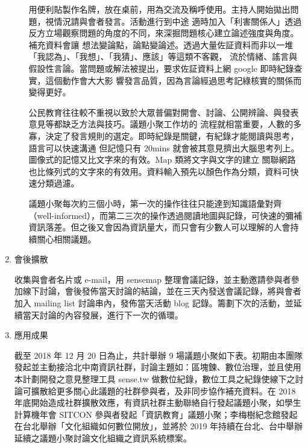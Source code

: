 \documentclass[12pt,a4paper]{article}
\begin{document}
\begin{enumerate}
\begin{enumerate}
用便利貼製作名牌，放在桌前，用為交流及稱呼使用。主持人開始拋出問題，視情況請與會者發言。活動進行到中途
適時加入「利害關係人」透過反方立場觀察問題的角度的不同，來深掘問題核心建立論述強度與角度。補充資料會讓
想法變論點，論點變論述。透過大量佐証資料而非以一堆「我認為」、「我想」、「我猜」、應該」等這類不客觀，
流於情緒、謠言與假設性言論。當問題或解法被提出，要求佐証資料上網 google 即時紀錄查實，這個動作會大大影
響發言品質，因為言論經過思考記綠核實的關係而變得更好。

公民教育往往較不重視以致於大眾普偏對開會、討論、公開辨論、與發表意見等都缺乏方法與技巧。議題小聚工作坊的
流程就相當重要，人數的多寡，決定了發言規則的選定。即時紀錄是關鍵，有紀錄才能閱讀與思考，語言可以快速溝通
但記憶只有 20mins 就會被其意見擠出大腦思考列上。圖像式的記憶又比文字來的有效。Map 類將文字與文字的建立
關聯網路也比條列式的文字來的有效用。資料輸入預先以顏色作為分類，資料可快速分類過濾。

議題小聚每次約三個小時，第一次的操作往往只能達到知識語彙對齊（well-informed），而第二三次的操作透過閱讀地圖與記錄，可快速的彌補資訊落差。但之後又會因為資訊量大，而只會有少數人可以理解的人會持續關心相關議題。
\end{enumerate}
\item 會後擴散
\label{sec:orgb343b39}

收集與會者名片或 e-mail，用 sensemap 整理會議記錄，並主動邀請參與者參加線下討論，會後發佈當天討論的結論，並在三天內發送會議記錄，將與會者加入 mailing list 討論串內，發佈當天活動 blog 記錄。籌劃下次的活動，並延續當天討論的內容發展，進行下一次的循環。

\item 應用成果
\label{sec:org72f8f8e}

截至 2018 年 12 月 20 日為止，共計舉辦 9 場議題小聚如下表。初期由本團隊發起並主動接洽北中南資訊社群，討論主題如：區塊鍊、數位治理，並且使用本計劃開發之意見整理工具 sense.tw 做數位紀錄，數位工具之紀錄使線下之討論可擴散給更多關心此議題的社群參與者，及非同步協作補充資料。在 2018 年底開始造成社群擴散效應，有資訊社群主動聯絡自行發起議題小聚，如學生計算機年會 SITCON 參與者發起「資訊教育」議題小聚；李梅樹紀念館發起在台北舉辦「文化組織如何數位開放」，並將於 2019 年持續在台北、台中舉辦延續之議題小聚討論文化組織之資訊系統標案。


\end{enumerate}
\end{document}
